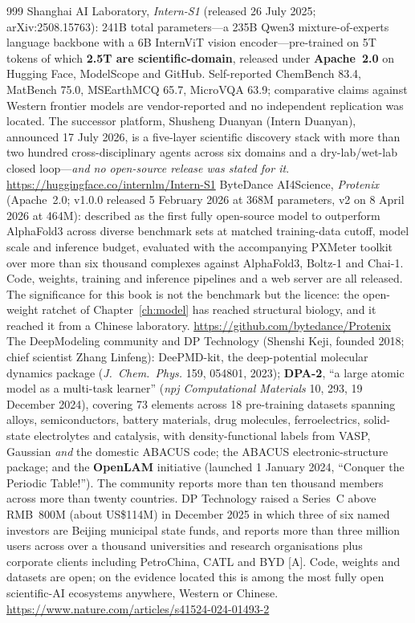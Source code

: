 \begin{thebibliography}{999}
 Shanghai AI Laboratory, \emph{Intern-S1} (released 26 July 2025; arXiv:2508.15763): 241B total parameters---a 235B Qwen3 mixture-of-experts language backbone with a 6B InternViT vision encoder---pre-trained on 5T tokens of which \textbf{2.5T are scientific-domain}, released under \textbf{Apache~2.0} on Hugging Face, ModelScope and GitHub. Self-reported ChemBench 83.4, MatBench 75.0, MSEarthMCQ 65.7, MicroVQA 63.9; comparative claims against Western frontier models are vendor-reported and no independent replication was located. The successor platform, Shusheng Duanyan (Intern Duanyan), announced 17 July 2026, is a five-layer scientific discovery stack with more than two hundred cross-disciplinary agents across six domains and a dry-lab/wet-lab closed loop---\emph{and no open-source release was stated for it}. \url{https://huggingface.co/internlm/Intern-S1}
 ByteDance AI4Science, \emph{Protenix} (Apache~2.0; v1.0.0 released 5 February 2026 at 368M parameters, v2 on 8 April 2026 at 464M): described as the first fully open-source model to outperform AlphaFold3 across diverse benchmark sets at matched training-data cutoff, model scale and inference budget, evaluated with the accompanying PXMeter toolkit over more than six thousand complexes against AlphaFold3, Boltz-1 and Chai-1. Code, weights, training and inference pipelines and a web server are all released. The significance for this book is not the benchmark but the licence: the open-weight ratchet of Chapter~\ref{ch:model} has reached structural biology, and it reached it from a Chinese laboratory. \url{https://github.com/bytedance/Protenix}
 The DeepModeling community and DP Technology (Shenshi Keji, founded 2018; chief scientist Zhang Linfeng): DeePMD-kit, the deep-potential molecular dynamics package (\emph{J.\ Chem.\ Phys.} 159, 054801, 2023); \textbf{DPA-2}, ``a large atomic model as a multi-task learner'' (\emph{npj Computational Materials} 10, 293, 19 December 2024), covering 73 elements across 18 pre-training datasets spanning alloys, semiconductors, battery materials, drug molecules, ferroelectrics, solid-state electrolytes and catalysis, with density-functional labels from VASP, Gaussian \emph{and} the domestic ABACUS code; the ABACUS electronic-structure package; and the \textbf{OpenLAM} initiative (launched 1 January 2024, ``Conquer the Periodic Table!''). The community reports more than ten thousand members across more than twenty countries. DP Technology raised a Series~C above RMB~800M (about US\$114M) in December 2025 in which three of six named investors are Beijing municipal state funds, and reports more than three million users across over a thousand universities and research organisations plus corporate clients including PetroChina, CATL and BYD [A]. Code, weights and datasets are open; on the evidence located this is among the most fully open scientific-AI ecosystems anywhere, Western or Chinese. \url{https://www.nature.com/articles/s41524-024-01493-2}

\end{thebibliography}
